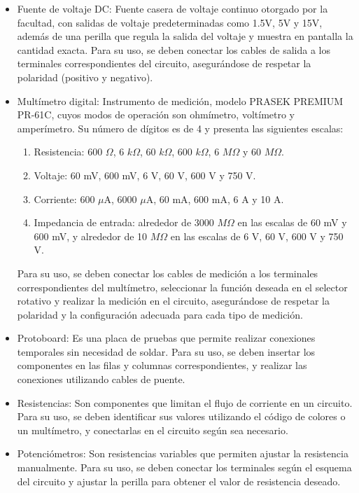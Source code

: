 \documentclass[12pt,a4paper]{article}
\begin{document}
\begin{itemize}
    \item Fuente de voltaje DC: Fuente casera de voltaje continuo otorgado por la facultad, con salidas de voltaje predeterminadas como 1.5V, 5V y 15V, además de una perilla que regula la salida del voltaje y muestra en pantalla la cantidad exacta. Para su uso, se deben conectar los cables de salida a los terminales correspondientes del circuito, asegurándose de respetar la polaridad (positivo y negativo).
    \item Multímetro digital: Instrumento de medición, modelo PRASEK PREMIUM PR-61C, cuyos modos de operación son ohmímetro, voltímetro y amperímetro. Su número de dígitos es de 4 y presenta las siguientes escalas:
    \begin{enumerate}
        \item Resistencia: 600 $\Omega$, 6 $k\Omega$, 60 $k\Omega$, 600 $k\Omega$, 6 $M\Omega$ y 60 $M\Omega$.
        \item Voltaje: 60 mV, 600 mV, 6 V, 60 V, 600 V y 750 V.
        \item Corriente: 600 $\mu$A, 6000 $\mu$A, 60 mA, 600 mA, 6 A y 10 A.
        \item Impedancia de entrada: alrededor de 3000 $M\Omega$ en las escalas de 60 mV y 600 mV, y alrededor de 10 $M\Omega$ en las escalas de 6 V, 60 V, 600 V y 750 V.
    \end{enumerate}
	Para su uso, se deben conectar los cables de medición a los terminales correspondientes del multímetro, seleccionar la función deseada en el selector rotativo y realizar la medición en el circuito, asegurándose de respetar la polaridad y la configuración adecuada para cada tipo de medición.
    \item Protoboard: Es una placa de pruebas que permite realizar conexiones temporales sin necesidad de soldar. Para su uso, se deben insertar los componentes en las filas y columnas correspondientes, y realizar las conexiones utilizando cables de puente.
    \item Resistencias: Son componentes que limitan el flujo de corriente en un circuito. Para su uso, se deben identificar sus valores utilizando el código de colores o un multímetro, y conectarlas en el circuito según sea necesario.
    \item Potenciómetros: Son resistencias variables que permiten ajustar la resistencia manualmente. Para su uso, se deben conectar los terminales según el esquema del circuito y ajustar la perilla para obtener el valor de resistencia deseado.

\end{itemize}
\end{document}

